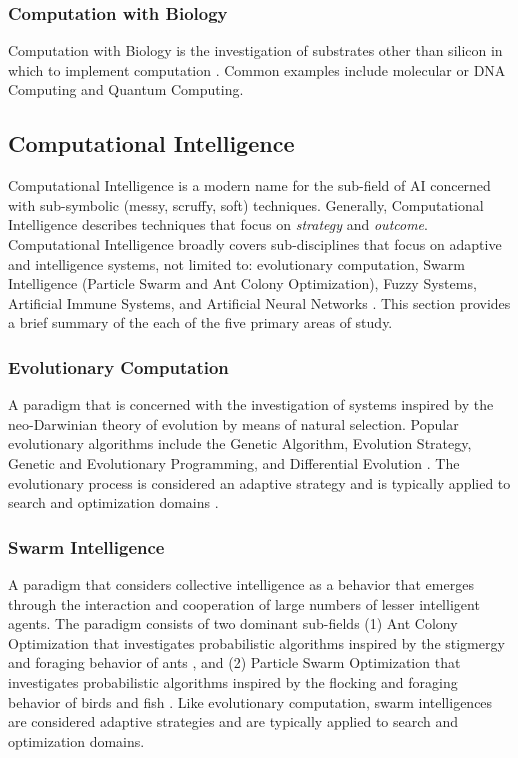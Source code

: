 \subsubsection{Computation with Biology}
Computation with Biology is the investigation of substrates other than silicon in which to implement computation \cite{Aaronson2005}. Common examples include molecular or DNA Computing and Quantum Computing.

% 
% 
\subsection{Computational Intelligence}
\label{sec:computationl_intelligence}
Computational Intelligence is a modern name for the sub-field of AI concerned with sub-symbolic (messy, scruffy, soft) techniques. Generally, Computational Intelligence describes techniques that focus on \emph{strategy} and \emph{outcome}. 
Computational Intelligence broadly covers sub-disciplines that focus on adaptive and intelligence systems, not limited to: evolutionary computation, Swarm Intelligence (Particle Swarm and Ant Colony Optimization), Fuzzy Systems, Artificial Immune Systems, and Artificial Neural Networks \cite{Engelbrecht2007, Pedrycz1997}. This section provides a brief summary of the each of the five primary areas of study.

\subsubsection{Evolutionary Computation} 
A paradigm that is concerned with the investigation of systems inspired by the neo-Darwinian theory of evolution by means of natural selection. Popular evolutionary algorithms include the Genetic Algorithm, Evolution Strategy, Genetic and Evolutionary Programming, and Differential Evolution \cite{Baeck2000, Baeck2000a}. The evolutionary process is considered an adaptive strategy and is typically applied to search and optimization domains \cite{Goldberg1989, Holland1975}.

\subsubsection{Swarm Intelligence} 
A paradigm that considers collective intelligence as a behavior that emerges through the interaction and cooperation of large numbers of lesser intelligent agents. The paradigm consists of two dominant sub-fields (1) Ant Colony Optimization that investigates probabilistic algorithms inspired by the stigmergy and foraging behavior of ants \cite{Bonabeau1999, Dorigo2004}, and (2) Particle Swarm Optimization that investigates probabilistic algorithms inspired by the flocking and foraging behavior of birds and fish \cite{Shi2001}. Like evolutionary computation, swarm intelligences are considered adaptive strategies and are typically applied to search and optimization domains.

